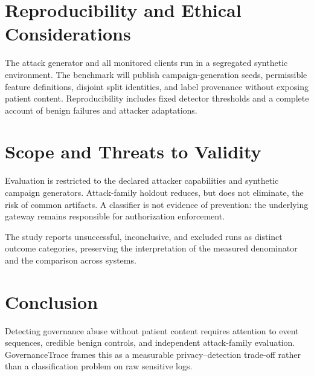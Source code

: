 \documentclass[11pt,a4paper]{article}
\begin{document}
\section{Reproducibility and Ethical Considerations}
The attack generator and all monitored clients run in a segregated synthetic environment. The benchmark will publish campaign-generation seeds, permissible feature definitions, disjoint split identities, and label provenance without exposing patient content. Reproducibility includes fixed detector thresholds and a complete account of benign failures and attacker adaptations.

\section{Scope and Threats to Validity}
Evaluation is restricted to the declared attacker capabilities and synthetic campaign generators. Attack-family holdout reduces, but does not eliminate, the risk of common artifacts. A classifier is not evidence of prevention: the underlying gateway remains responsible for authorization enforcement.

The study reports unsuccessful, inconclusive, and excluded runs as distinct outcome categories, preserving the interpretation of the measured denominator and the comparison across systems.

\section{Conclusion}
Detecting governance abuse without patient content requires attention to event sequences, credible benign controls, and independent attack-family evaluation. GovernanceTrace frames this as a measurable privacy–detection trade-off rather than a classification problem on raw sensitive logs.



\end{document}
